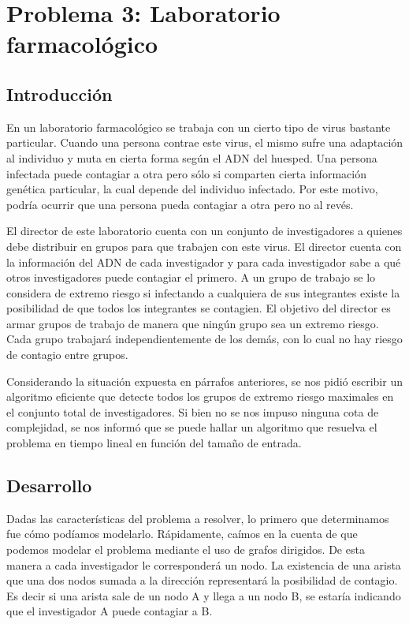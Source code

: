\section{Problema 3: Laboratorio farmacol\'ogico}

\subsection{Introducci\'on}

\quad En un laboratorio farmacológico se trabaja con un cierto tipo de virus bastante particular. Cuando una persona contrae este virus, el mismo sufre una adaptación al individuo y muta en cierta forma según el ADN del huesped. Una persona infectada puede contagiar a otra pero sólo si comparten cierta información genética particular, la cual depende del individuo infectado. Por este motivo, podría ocurrir que una persona pueda contagiar a otra pero no al revés.

\quad El director de este laboratorio cuenta con un conjunto de investigadores a quienes debe distribuir en grupos para que trabajen con este virus. El director cuenta con la información del ADN de cada investigador y para cada investigador sabe a qué otros investigadores puede contagiar el primero. A un grupo de trabajo se lo considera de extremo riesgo si infectando a cualquiera de sus integrantes existe la posibilidad de que todos los integrantes se contagien. El objetivo del director es armar grupos de trabajo de manera que ningún grupo sea un extremo riesgo. Cada grupo trabajará independientemente de los demás, con lo cual no hay riesgo de contagio entre grupos.

\quad Considerando la situación expuesta en párrafos anteriores, se nos pidió escribir un algoritmo eficiente que detecte todos los grupos de extremo riesgo maximales en el conjunto total de investigadores. Si bien no se nos impuso ninguna cota de complejidad, se nos informó que se puede hallar un algoritmo que resuelva el problema en tiempo lineal en función del tamaño de entrada.


\subsection{Desarrollo}

\quad Dadas las características del problema a resolver, lo primero que determinamos fue cómo podíamos modelarlo. Rápidamente, caímos en la cuenta de que podemos modelar el problema mediante el uso de grafos dirigidos. De esta manera a cada investigador le corresponderá un nodo. La existencia de una arista que una dos nodos sumada a la dirección representará la posibilidad de contagio. Es decir si una arista sale de un nodo A y llega a un nodo B, se estaría indicando que el investigador A puede contagiar a B.

